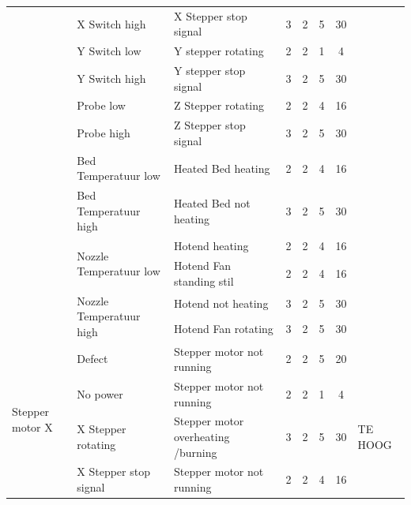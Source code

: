 \documentclass{article}
\begin{document}
\begin{landscape}
\begin{longtable}{|l|l|l|c|c|c|c|l|}
                                            & X Switch high             & X Stepper stop signal     & 3 & 2 & 5 & 30 & \\
                                            & Y Switch low              & Y stepper rotating        & 2 & 2 & 1 &  4 & \\
                                            & Y Switch high             & Y stepper stop signal     & 3 & 2 & 5 & 30 & \\
                                            & Probe low                 & Z Stepper rotating        & 2 & 2 & 4 & 16 & \\
                                            & Probe high                & Z Stepper stop signal     & 3 & 2 & 5 & 30 & \\
                                            & Bed Temperatuur low       & Heated Bed heating        & 2 & 2 & 4 & 16 & \\
                                            & Bed Temperatuur high      & Heated Bed not heating    & 3 & 2 & 5 & 30 & \\
                                            & \multirow{2}{*}{Nozzle Temperatuur low}    & Hotend heating            & 2 & 2 & 4 & 16 & \\
                                            &                                            & Hotend Fan standing stil  & 2 & 2 & 4 & 16 & \\
                                            & \multirow{2}{*}{Nozzle Temperatuur high}   & Hotend not heating        & 3 & 2 & 5 & 30 & \\
                                            &                                            & Hotend Fan rotating       & 3 & 2 & 5 & 30 & \\
                                            \hline
        \multirow{4}{*}{Stepper motor X}    & Defect                & Stepper motor not running             & 2 & 2 & 5 & 20 & \\
                                            & No power              & Stepper motor not running             & 2 & 2 & 1 &  4 & \\
                                            & X Stepper rotating    & Stepper motor overheating /burning    & 3 & 2 & 5 & 30 & TE HOOG \\
                                            & X Stepper stop signal & Stepper motor not running             & 2 & 2 & 4 & 16 & \\ 
                                            \hline 

\end{longtable}
\end{landscape}
\end{document}
